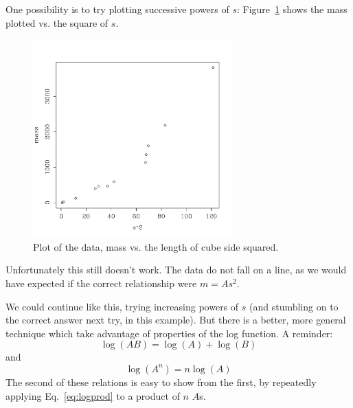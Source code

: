 \documentclass{article}
\begin{document}
One possibility is to try plotting successive powers of $s$:  Figure~\ref{fig:mvss2} shows the mass plotted vs. the square of $s$.
\begin{figure}
\begin{centering}
\includegraphics[width=3in]{../images/mass-v-ssq.pdf}
\caption{Plot of the data, mass vs. the length of cube side squared.}
\label{fig:mvss2}
\end{centering}
\end{figure}
Unfortunately this still doesn't work.  The data do not fall on a line, as we would have expected if the correct relationship were $m=As^2$.

We could continue like this, trying increasing powers of $s$ (and stumbling on to the correct answer next try, in this example).  But there is a better, more general technique which take advantage of properties of the log function.  A reminder:
\begin{equation}
\log(AB) = \log(A) + \log(B)
\label{eq:logprod}
\end{equation}
and
\begin{equation}
\log(A^n) = n \log(A)
\label{eq:logpow}
\end{equation}
The second of these relations is easy to show from the first, by repeatedly applying Eq.~\ref{eq:logprod} to a product of $n$ $A$s.
\end{document}
